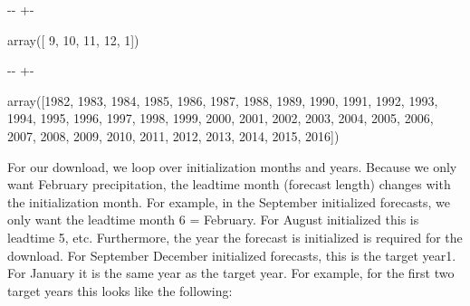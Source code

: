 \documentclass[letterpaper,10pt,english]{sphinxmanual}
\newlength\nbsphinxcodecellspacing
\begin{document}
{

\kern-\sphinxverbatimsmallskipamount\kern-\baselineskip
\kern+\FrameHeightAdjust\kern-\fboxrule
\vspace{\nbsphinxcodecellspacing}

\begin{sphinxVerbatim}[commandchars=\\\{\}]
\llap{\color{nbsphinxout}[58]:\,\hspace{\fboxrule}\hspace{\fboxsep}}array([ 9, 10, 11, 12,  1])
\end{sphinxVerbatim}
}

{

\kern-\sphinxverbatimsmallskipamount\kern-\baselineskip
\kern+\FrameHeightAdjust\kern-\fboxrule
\vspace{\nbsphinxcodecellspacing}

\begin{sphinxVerbatim}[commandchars=\\\{\}]
\llap{\color{nbsphinxout}[58]:\,\hspace{\fboxrule}\hspace{\fboxsep}}array([1982, 1983, 1984, 1985, 1986, 1987, 1988, 1989, 1990, 1991, 1992,
       1993, 1994, 1995, 1996, 1997, 1998, 1999, 2000, 2001, 2002, 2003,
       2004, 2005, 2006, 2007, 2008, 2009, 2010, 2011, 2012, 2013, 2014,
       2015, 2016])
\end{sphinxVerbatim}
}

For our download, we loop over initialization months and years. Because we only want February precipitation, the leadtime month (forecast length) changes with the initialization month. For example, in the September initialized forecasts, we only want the leadtime month 6 = February. For August initialized this is leadtime 5, etc. Furthermore, the year the forecast is initialized is required for the download. For September \sphinxhyphen{} December initialized forecasts, this is the target year\sphinxhyphen{}1. For January
it is the same year as the target year. For example, for the first two target years this looks like the following:
\end{document}
